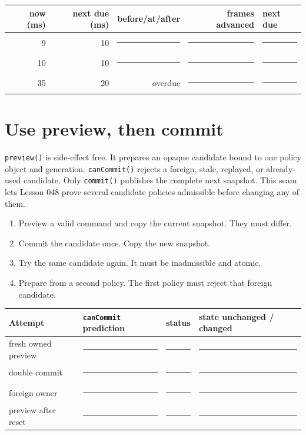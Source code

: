 \documentclass[11pt]{article}
\newcommand{\blankline}{\rule{0.88in}{0.4pt}}
\begin{document}
\begin{tabularx}{\linewidth}{@{}r r r r X@{}}
\toprule
now (ms) & next due (ms) & before/at/after & frames advanced & next due\\
\midrule
9 & 10 & \blankline & \blankline & \blankline\\[7pt]
10 & 10 & \blankline & \blankline & \blankline\\[7pt]
35 & 20 & overdue & \blankline & \blankline\\
\bottomrule
\end{tabularx}

\newpage
\section{Use preview, then commit}
\texttt{preview()} is side-effect free. It prepares an opaque candidate bound
to one policy object and generation. \texttt{canCommit()} rejects a foreign,
stale, replayed, or already-used candidate. Only \texttt{commit()} publishes
the complete next snapshot. This seam lets Lesson 048 prove several candidate
policies admissible before changing any of them.

\begin{enumerate}
 \item Preview a valid command and copy the current snapshot. They must differ.
 \item Commit the candidate once. Copy the new snapshot.
 \item Try the same candidate again. It must be inadmissible and atomic.
 \item Prepare from a second policy. The first policy must reject that
       foreign candidate.
\end{enumerate}

\begin{tabularx}{\linewidth}{@{}l X X X@{}}
\toprule
Attempt & \texttt{canCommit} prediction & status & state unchanged / changed\\
\midrule
fresh owned preview & \blankline & \blankline & \blankline\\[8pt]
double commit & \blankline & \blankline & \blankline\\[8pt]
foreign owner & \blankline & \blankline & \blankline\\[8pt]
preview after reset & \blankline & \blankline & \blankline\\
\bottomrule
\end{tabularx}
\end{document}
